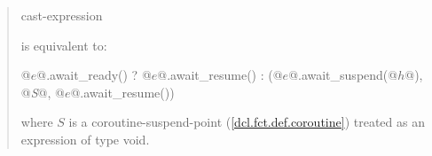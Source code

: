 \begin{quote}

%
%

\begin{ncbnf}
   cast-expression
\end{ncbnf}
is equivalent to:

\begin{codeblock}
  @$e$@.await_ready() ? @$e$@.await_resume() : (@$e$@.await_suspend(@$h$@), @\textit{S}@, @$e$@.await_resume())
\end{codeblock}
where $S$ is a coroutine-suspend-point (\ref{dcl.fct.def.coroutine}) treated as an expression of type void.


\end{quote}
